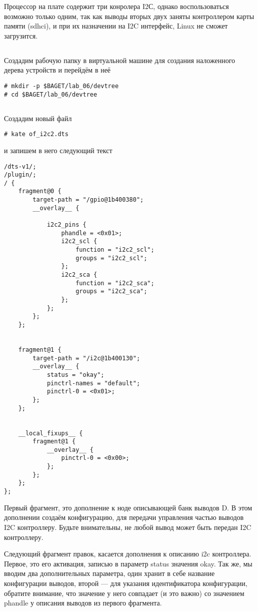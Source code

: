 Процессор на плате содержит три конролера I2С, однако воспользоваться возможно только одним, так как выводы вторых двух заняты контроллером карты памяти (sdhci), и при их назначении на I2C интерфейс, Linux не сможет загрузится.

\subsection{} Создадим рабочую папку в виртуальной машине для создания наложенного дерева устройств и перейдём в неё 
\begin{lstlisting}[style=bash]
# mkdir -p $BAGET/lab_06/devtree
# cd $BAGET/lab_06/devtree 
\end{lstlisting}

\subsection{}Создадим новый файл
\begin{lstlisting}[style=bash]
# kate of_i2c2.dts
\end{lstlisting}
и запишем в него следующий текст
\begin{lstlisting}[style=stdout]
/dts-v1/;
/plugin/;
/ {
	fragment@0 {
		target-path = "/gpio@1b400380";
		__overlay__ {
			
			i2c2_pins {
				phandle = <0x01>;
				i2c2_scl {
					function = "i2c2_scl";
					groups = "i2c2_scl";
				};
				i2c2_sca {
					function = "i2c2_sca";
					groups = "i2c2_sca";
				};
			};
		};
	};
	
	
	fragment@1 { 
		target-path = "/i2c@1b400130"; 
		__overlay__ { 
			status = "okay"; 
			pinctrl-names = "default"; 
			pinctrl-0 = <0x01>; 
		}; 
	}; 
	
	
	__local_fixups__ {
		fragment@1 {
			__overlay__ {
				pinctrl-0 = <0x00>;
			};
		};	
	};
};
\end{lstlisting}

Первый фрагмент, это дополнение к ноде описывающей банк выводов D. В этом дополнении создаём конфигурацию, для передачи управления частью выводов I2C контроллеру. Будьте внимательны, не любой вывод может быть передан I2C контроллеру. 

Следующий фрагмент правок, касается дополнения к описанию i2c контроллера. Первое, это его активация, записью в параметр status значения okay. Так же, мы вводим два дополнительных параметра, один хранит в себе название конфигурации выводов, второй — для указания идентификатора конфигурации, обратите внимание, что значение у него совпадает (и это важно) со значением phandle у описания выводов из первого фрагмента.

